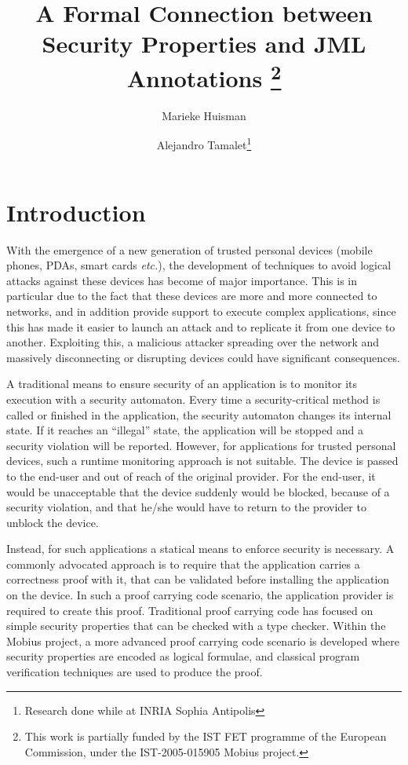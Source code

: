 \documentclass[]{llncs}
\title{A Formal Connection between Security Properties and JML Annotations
\thanks{This work is partially funded by the IST FET
programme of the European Commission, under the IST-2005-015905
\textsf{Mobius} project.}}
\author{Marieke Huisman\inst{1} \and Alejandro Tamalet\inst{2}\thanks{Research done while at INRIA Sophia Antipolis}}
\institute{INRIA Sophia Antipolis, France \and 
University of Nijmegen, Netherlands}
\begin{document}
\maketitle
\begin{abstract}
\end{abstract}

\section{Introduction}\label{SecIntro}

With the emergence of a new generation of trusted personal devices
(mobile phones, PDAs, smart cards \emph{etc.}), the development of
techniques to avoid logical attacks against these devices has become
of major importance. This is in particular due to the fact that these
devices are more and more connected to networks, and in addition
provide support to execute complex applications, since this has made
it easier to launch an attack and to replicate it from one device to
another.  Exploiting this, a malicious attacker spreading over the
network and massively disconnecting or disrupting devices could have
significant consequences.  


A traditional means to ensure security of an application is to monitor
its execution with a security automaton.  Every time a
security-critical method is called or finished in the application, the
security automaton changes its internal state. If it reaches an
``illegal'' state, the application will be stopped and a security
violation will be reported. However, for applications for trusted
personal devices, such a runtime monitoring approach is not
suitable. The device is passed to the end-user and out of reach of the
original provider. For the end-user, it would be unacceptable that the
device suddenly would be blocked, because of a security violation, and
that he/she would have to return to the provider to unblock the
device. 

Instead, for such applications a statical means to enforce security is
necessary. A commonly advocated approach is to require that the application
carries a correctness proof with it, that can be validated before
installing the application on the device. In such a proof carrying
code scenario, the application provider is required to create this
proof. Traditional proof carrying code has focused on simple security
properties that can be checked with a type checker. Within the
\textsf{Mobius} project, a more advanced proof carrying code scenario
is developed where security properties are encoded as logical
formulae, and classical program verification techniques are used to
produce the proof. 
\end{document}

